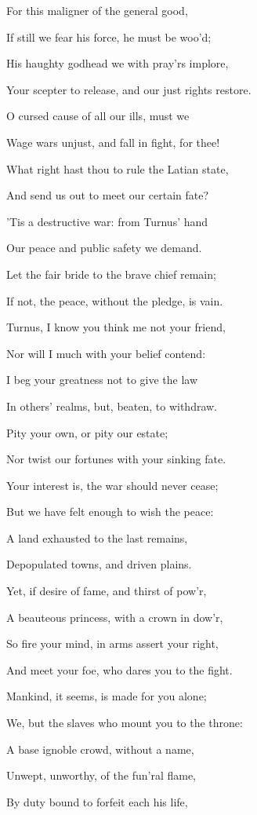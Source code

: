 For this maligner of the general good,

If still we fear his force, he must be woo’d;

His haughty godhead we with pray’rs implore,

Your scepter to release, and our just rights restore.

O cursed cause of all our ills, must we

Wage wars unjust, and fall in fight, for thee!

What right hast thou to rule the Latian state,

And send us out to meet our certain fate?

’Tis a destructive war: from Turnus’ hand

Our peace and public safety we demand.

Let the fair bride to the brave chief remain;

If not, the peace, without the pledge, is vain.

Turnus, I know you think me not your friend,

Nor will I much with your belief contend:

I beg your greatness not to give the law

In others’ realms, but, beaten, to withdraw.

Pity your own, or pity our estate;

Nor twist our fortunes with your sinking fate.

Your interest is, the war should never cease;

But we have felt enough to wish the peace:

A land exhausted to the last remains,

Depopulated towns, and driven plains.

Yet, if desire of fame, and thirst of pow’r,

A beauteous princess, with a crown in dow’r,

So fire your mind, in arms assert your right,

And meet your foe, who dares you to the fight.

Mankind, it seems, is made for you alone;

We, but the slaves who mount you to the throne:

A base ignoble crowd, without a name,

Unwept, unworthy, of the fun’ral flame,

By duty bound to forfeit each his life,


